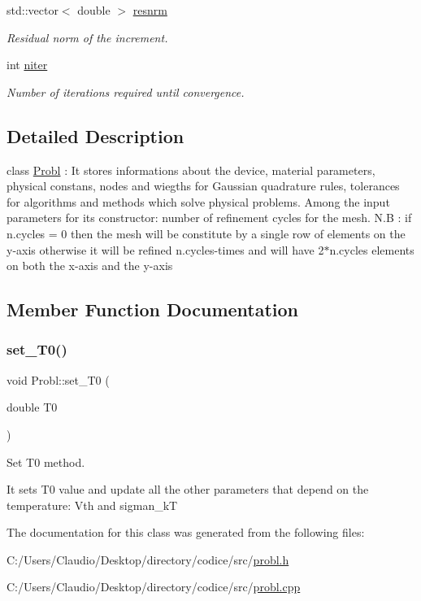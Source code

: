 \begin{DoxyCompactItemize}
std\+::vector$<$ double $>$ \mbox{\hyperlink{class_probl_a8366d5132536de44debdda93a930a4cc}{resnrm}}
\begin{DoxyCompactList}\small\item\em Residual norm of the increment. \end{DoxyCompactList}\item 
\mbox{\label{class_probl_a316f343116c835fc18e95aeec2f87407}} 
int \mbox{\hyperlink{class_probl_a316f343116c835fc18e95aeec2f87407}{niter}}
\begin{DoxyCompactList}\small\item\em Number of iterations required until convergence. \end{DoxyCompactList}\end{DoxyCompactItemize}


\subsection{Detailed Description}
class \mbox{\hyperlink{class_probl}{Probl}} \+: It stores informations about the device, material parameters, physical constans, nodes and wiegths for Gaussian quadrature rules, tolerances for algorithms and methods which solve physical problems. Among the input parameters for its constructor\+: number of refinement cycles for the mesh. N.\+B \+: if n.\+cycles = 0 then the mesh will be constitute by a single row of elements on the y-\/axis otherwise it will be refined n.\+cycles-\/times and will have 2$\ast$n.cycles elements on both the x-\/axis and the y-\/axis 

\subsection{Member Function Documentation}
\mbox{\label{class_probl_a015de30e9e1847638ec206b7d0341d8a}} 
\subsubsection{\texorpdfstring{set\+\_\+\+T0()}{set\_T0()}}
{\footnotesize\ttfamily void Probl\+::set\+\_\+\+T0 (\begin{DoxyParamCaption}\item[{double}]{T0 }\end{DoxyParamCaption})}



Set T0 method. 

It sets T0 value and update all the other parameters that depend on the temperature\+: Vth and sigman\+\_\+kT 

The documentation for this class was generated from the following files\+:\begin{DoxyCompactItemize}
\item 
C\+:/\+Users/\+Claudio/\+Desktop/directory/codice/src/\mbox{\hyperlink{probl_8h}{probl.\+h}}\item 
C\+:/\+Users/\+Claudio/\+Desktop/directory/codice/src/\mbox{\hyperlink{probl_8cpp}{probl.\+cpp}}\end{DoxyCompactItemize}
